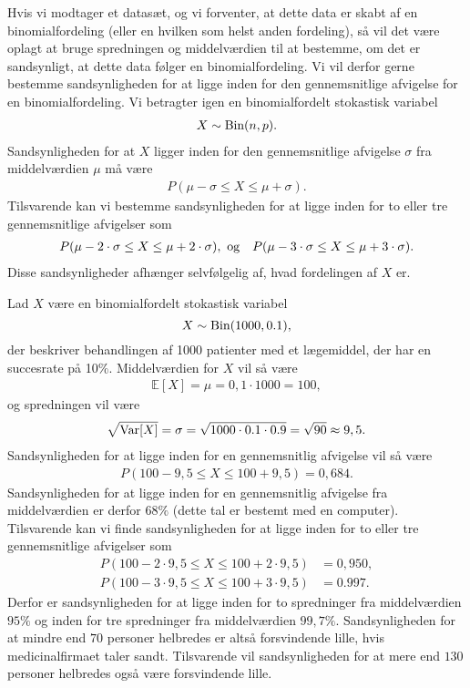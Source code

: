 Hvis vi modtager et datasæt, og vi forventer, at dette data er skabt af en binomialfordeling (eller en hvilken som helst anden fordeling), så vil det være oplagt at bruge spredningen og middelværdien til at bestemme, om det er sandsynligt, at dette data følger en binomialfordeling. Vi vil derfor gerne bestemme sandsynligheden for at ligge inden for den gennemsnitlige afvigelse for en binomialfordeling. Vi betragter igen en binomialfordelt stokastisk variabel 
\begin{align*}
X \sim \textnormal{Bin}(n,p).
\end{align*}
Sandsynligheden for at $X$ ligger inden for den gennemsnitlige afvigelse $\sigma$ fra middelværdien $\mu$ må være
\begin{align*}
P(\mu - \sigma \leq X \leq \mu + \sigma).
\end{align*}
Tilsvarende kan vi bestemme sandsynligheden for at ligge inden for to eller tre gennemsnitlige afvigelser som
\begin{align*}
&P(\mu - 2\cdot \sigma \leq X \leq \mu + 2\cdot \sigma), \textnormal{ og}
&P(\mu - 3\cdot \sigma \leq X \leq \mu + 3\cdot \sigma).
\end{align*}
Disse sandsynligheder afhænger selvfølgelig af, hvad fordelingen af $X$ er. 
\begin{exa}
Lad $X$ være en binomialfordelt stokastisk variabel
\[
X \sim \textnormal{Bin}(1000,0.1),
\]
der beskriver behandlingen af 1000 patienter med et lægemiddel, der har en succesrate på 10$\%$. Middelværdien for $X$ vil så være
\begin{align*}
\mathbb{E}[X] = \mu = 0,1\cdot 1000 = 100,
\end{align*}
og spredningen vil være
\begin{align*}
\sqrt{\textnormal{Var}[X]} = \sigma = \sqrt{1000\cdot 0.1 \cdot 0.9} = \sqrt{90} \approx 9,5.
\end{align*}
Sandsynligheden for at ligge inden for en gennemsnitlig afvigelse vil så være
\begin{align*}
P(100-9,5 \leq X \leq 100+9,5) = 0,684.
\end{align*}
Sandsynligheden for at ligge inden for en gennemsnitlig afvigelse fra middelværdien er derfor $68\%$ (dette tal er bestemt med en computer). Tilsvarende kan vi finde sandsynligheden for at ligge inden for to eller tre gennemsnitlige afvigelser som
\begin{align*}
P(100-2\cdot 9,5 \leq X \leq 100+2\cdot 9,5 ) &= 0,950,\\
P(100-3\cdot 9,5 \leq X \leq 100+3\cdot 9,5) &= 0.997.
\end{align*}
Derfor er sandsynligheden for at ligge inden for to spredninger fra middelværdien $95\%$ og inden for tre spredninger fra middelværdien $99,7\%$. Sandsynligheden for at mindre end $70$ personer helbredes er altså forsvindende lille, hvis medicinalfirmaet taler sandt. Tilsvarende vil sandsynligheden for at mere end $130$ personer helbredes også være forsvindende lille. 
\end{exa}


